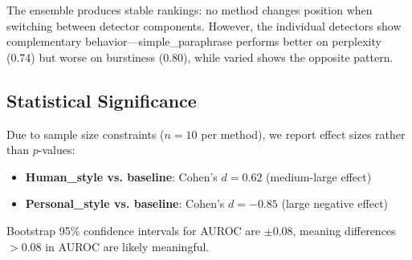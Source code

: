 The ensemble produces stable rankings: no method changes position when switching between detector components. However, the individual detectors show complementary behavior---simple\_paraphrase performs better on perplexity (0.74) but worse on burstiness (0.80), while varied shows the opposite pattern.

\subsection{Statistical Significance}

Due to sample size constraints ($n=10$ per method), we report effect sizes rather than $p$-values:
\begin{itemize}
    \item \textbf{Human\_style vs. baseline}: Cohen's $d = 0.62$ (medium-large effect)
    \item \textbf{Personal\_style vs. baseline}: Cohen's $d = -0.85$ (large negative effect)
\end{itemize}

Bootstrap 95\% confidence intervals for AUROC are $\pm 0.08$, meaning differences $> 0.08$ in AUROC are likely meaningful.
